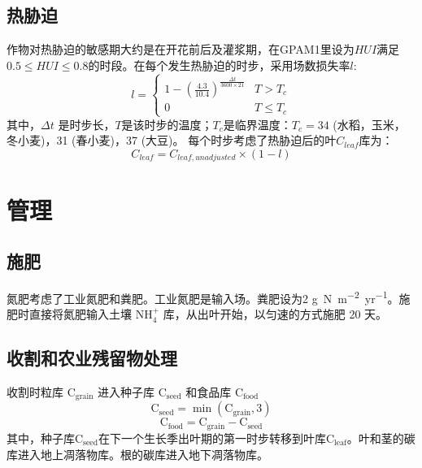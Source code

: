 \subsection{热胁迫}
作物对热胁迫的敏感期大约是在开花前后及灌浆期，在GPAM1里设为$HUI $满足$0.5 \leq HUI \leq 0.8$的时段。在每个发生热胁迫的时步，采用场数损失率$l$:
\begin{equation}
l=\left\{\begin{array}{cc}1-\left(\frac{4.3}{10.4}\right)^{\frac{\Delta t}{3600\times 21}} & T>T_{c} \\ 0 & T \leq T_{c}\end{array}\right.
\end{equation}
其中，$\Delta t$ 是时步长，$T$是该时步的温度；$T_c$是临界温度：$T_c=34$ \textcelsius (水稻，玉米，冬小麦)，31 \textcelsius (春小麦)，37 \textcelsius (大豆)。
每个时步考虑了热胁迫后的叶$C_{leaf}$库为：
\begin{equation}
C_{leaf}=C_{leaf,  {unadjusted}} \times (1-l)
\end{equation}


\section{管理}
\subsection{施肥}
氮肥考虑了工业氮肥和粪肥。工业氮肥是输入场。粪肥设为2 \unit{g.N.m^{−2}.yr^{−1}}。施肥时直接将氮肥输入土壤 $\mathrm{NH_4^+}$ 库，从出叶开始，以匀速的方式施肥 20 天。

\subsection{收割和农业残留物处理}
收割时粒库 $\mathrm{C_{grain}}$ 进入种子库 $\mathrm{C_{seed}}$ 和食品库 $\mathrm{C_{food}}$
\begin{equation}
\mathrm{{C}_{seed}}=\min \left(\mathrm{C_{grain}}, 3\right)
\end{equation}
\begin{equation}
\mathrm{C_{food}}=\mathrm{C_{grain}}-\mathrm{C_{seed}}
\end{equation}
其中，种子库$\mathrm{C_{seed}}$在下一个生长季出叶期的第一时步转移到叶库$\mathrm{C_{leaf}}$。叶和茎的碳库进入地上凋落物库。根的碳库进入地下凋落物库。

